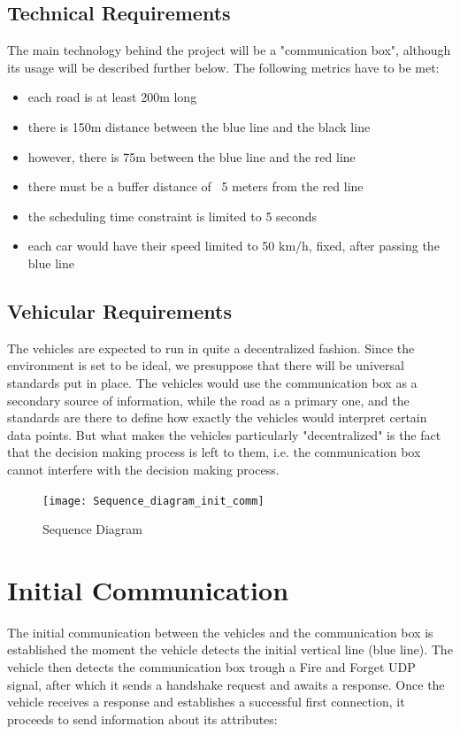 \documentclass[conference]{IEEEtran}
\begin{document}
\subsection{Technical Requirements}
The main technology behind the project will be a "communication box", although its usage will be described further below. The following metrics have to be met:
\begin{itemize}
	\item each road is at least 200m long
	\item there is 150m distance between the blue line and the black line
	\item however, there is 75m between the blue line and the red line
	\item there must be a buffer distance of ~5 meters from the red line
	\item the scheduling time constraint is limited to 5 seconds
	\item each car would have their speed limited to 50 km/h, fixed, after passing the blue line
\end{itemize} 
\subsection{Vehicular Requirements}
The vehicles are expected to run in quite a decentralized fashion. Since the environment is set to be ideal, we presuppose that there will be universal standards put in place. The vehicles would use the communication box as a secondary source of information, while the road as a primary one, and the standards are there to define how exactly the vehicles would interpret certain data points. But what makes the vehicles particularly "decentralized" is the fact that the decision making process is left to them, i.e. the communication box cannot interfere with the decision making process.
\begin{figure}[h!]
	\texttt{[image: Sequence\_diagram\_init\_comm]}
	\caption{Sequence Diagram}
	\centering
\end{figure}


\section{Initial Communication}
The initial communication between the vehicles and the communication box is established the moment the vehicle detects the initial vertical line (blue line). The vehicle then detects the communication box trough a Fire and Forget UDP signal, after which it sends a handshake request and awaits a response. Once the vehicle receives a response and establishes a successful first connection, it proceeds to send information about its attributes:
\end{document}

